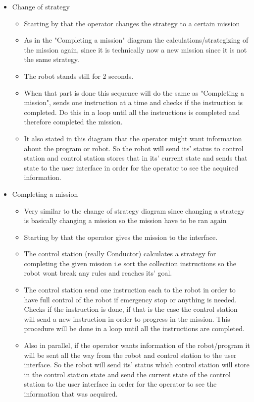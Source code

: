 \begin{itemize}
    \item Change of strategy 
       \begin{itemize}
           \item Starting by that the operator changes the strategy to a certain mission
           \item As in the "Completing a mission" diagram the calculations/strategizing of the mission again, since it is technically now a new mission since it is not the same strategy.
           \item The robot stands still for 2 seconds.
           \item When that part is done this sequence will do the same as "Completing a mission", sends one instruction at a time and checks if the instruction is completed. Do this in a loop until all the instructions is completed and therefore completed the mission.
           \item It also stated in this diagram that the operator might want information about the program or robot. So the robot will send its' status to control station and control station stores that in its' current state and sends that state to the user interface in order for the operator to see the acquired information.
       \end{itemize}
    \item Completing a mission
       \begin{itemize}
           \item Very similar to the change of strategy diagram since changing a strategy is basically changing a mission so the mission have to be ran again
           \item Starting by that the operator gives the mission to the interface.
           \item The control station (really Conductor) calculates a strategy for completing the given mission i.e sort the collection instructions so the robot wont break any rules and reaches its' goal.
           \item The control station send one instruction each to the robot in order to have full control of the robot if emergency stop or anything is needed. Checks if the instruction is done, if that is the case the control station will send a new instruction in order to progress in the mission. This procedure will be done in a loop until all the instructions are completed.
           \item Also in parallel, if the operator wants information of the robot/program it will be sent all the way from the robot and control station to the user interface. So the robot will send its' status which control station will store in the control station state and send the current state of the control station to the user interface in order for the operator to see the information that was acquired.   

\end{itemize}
\end{itemize}
